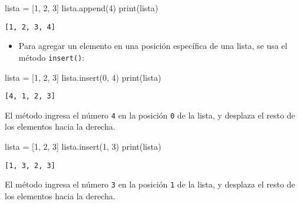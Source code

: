 \documentclass[
  letterpaper,
  DIV=11,
  numbers=noendperiod]{scrreprt}
\newenvironment{Shaded}{\begin{snugshade}}{\end{snugshade}}
\newcommand{\BuiltInTok}[1]{\textcolor[rgb]{0.00,0.23,0.31}{#1}}
\newcommand{\DecValTok}[1]{\textcolor[rgb]{0.68,0.00,0.00}{#1}}
\newcommand{\NormalTok}[1]{\textcolor[rgb]{0.00,0.23,0.31}{#1}}
\newcommand{\OperatorTok}[1]{\textcolor[rgb]{0.37,0.37,0.37}{#1}}
\providecommand{\tightlist}{%
  \setlength{\itemsep}{0pt}\setlength{\parskip}{0pt}}\usepackage{longtable,booktabs,array}
\begin{document}
\begin{Shaded}
\begin{Highlighting}[]
\NormalTok{lista }\OperatorTok{=}\NormalTok{ [}\DecValTok{1}\NormalTok{, }\DecValTok{2}\NormalTok{, }\DecValTok{3}\NormalTok{]}
\NormalTok{lista.append(}\DecValTok{4}\NormalTok{)}
\BuiltInTok{print}\NormalTok{(lista)}
\end{Highlighting}
\end{Shaded}

\begin{verbatim}
[1, 2, 3, 4]
\end{verbatim}

\begin{itemize}
\tightlist
\item
  Para agregar un elemento en una posición específica de una lista, se
  usa el método \texttt{insert()}:
\end{itemize}

\begin{Shaded}
\begin{Highlighting}[]
\NormalTok{lista }\OperatorTok{=}\NormalTok{ [}\DecValTok{1}\NormalTok{, }\DecValTok{2}\NormalTok{, }\DecValTok{3}\NormalTok{]}
\NormalTok{lista.insert(}\DecValTok{0}\NormalTok{, }\DecValTok{4}\NormalTok{)}
\BuiltInTok{print}\NormalTok{(lista)}
\end{Highlighting}
\end{Shaded}

\begin{verbatim}
[4, 1, 2, 3]
\end{verbatim}

El método ingresa el número \texttt{4} en la posición \texttt{0} de la
lista, y desplaza el resto de los elementos hacia la derecha.

\begin{Shaded}
\begin{Highlighting}[]
\NormalTok{lista }\OperatorTok{=}\NormalTok{ [}\DecValTok{1}\NormalTok{, }\DecValTok{2}\NormalTok{, }\DecValTok{3}\NormalTok{]}
\NormalTok{lista.insert(}\DecValTok{1}\NormalTok{, }\DecValTok{3}\NormalTok{)}
\BuiltInTok{print}\NormalTok{(lista)}
\end{Highlighting}
\end{Shaded}

\begin{verbatim}
[1, 3, 2, 3]
\end{verbatim}

El método ingresa el número \texttt{3} en la posición \texttt{1} de la
lista, y desplaza el resto de los elementos hacia la derecha.
\end{document}
